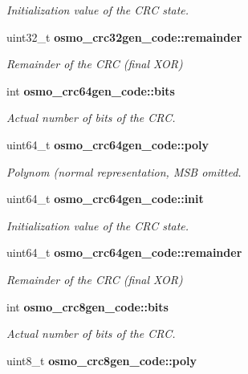 \begin{DoxyCompactItemize}
\begin{DoxyCompactList}\small\item\em Initialization value of the C\-R\-C state. \end{DoxyCompactList}\item 
uint32\-\_\-t {\bf osmo\-\_\-crc32gen\-\_\-code\-::remainder}\label{group__crcgen_gaa0fc5a5c0a648855bae5d975fc8829c1}

\begin{DoxyCompactList}\small\item\em Remainder of the C\-R\-C (final X\-O\-R) \end{DoxyCompactList}\item 
int {\bf osmo\-\_\-crc64gen\-\_\-code\-::bits}\label{group__crcgen_ga564630c90a1088175bb62126f7c9b0c3}

\begin{DoxyCompactList}\small\item\em Actual number of bits of the C\-R\-C. \end{DoxyCompactList}\item 
uint64\-\_\-t {\bf osmo\-\_\-crc64gen\-\_\-code\-::poly}\label{group__crcgen_gabef85ea259654d573330a1fad0b7f969}

\begin{DoxyCompactList}\small\item\em Polynom (normal representation, M\-S\-B omitted. \end{DoxyCompactList}\item 
uint64\-\_\-t {\bf osmo\-\_\-crc64gen\-\_\-code\-::init}\label{group__crcgen_ga73757c2782b9d2e48a64a7d53ea605c3}

\begin{DoxyCompactList}\small\item\em Initialization value of the C\-R\-C state. \end{DoxyCompactList}\item 
uint64\-\_\-t {\bf osmo\-\_\-crc64gen\-\_\-code\-::remainder}\label{group__crcgen_ga432d6a569fd5d86bb80a7f6fe9c954e4}

\begin{DoxyCompactList}\small\item\em Remainder of the C\-R\-C (final X\-O\-R) \end{DoxyCompactList}\item 
int {\bf osmo\-\_\-crc8gen\-\_\-code\-::bits}\label{group__crcgen_ga9a2de2bd7a3809d82b83a25641129520}

\begin{DoxyCompactList}\small\item\em Actual number of bits of the C\-R\-C. \end{DoxyCompactList}\item 
uint8\-\_\-t {\bf osmo\-\_\-crc8gen\-\_\-code\-::poly}\label{group__crcgen_ga40cbd268cfea5c97f8380def8fd7baf2}


\end{DoxyCompactItemize}
